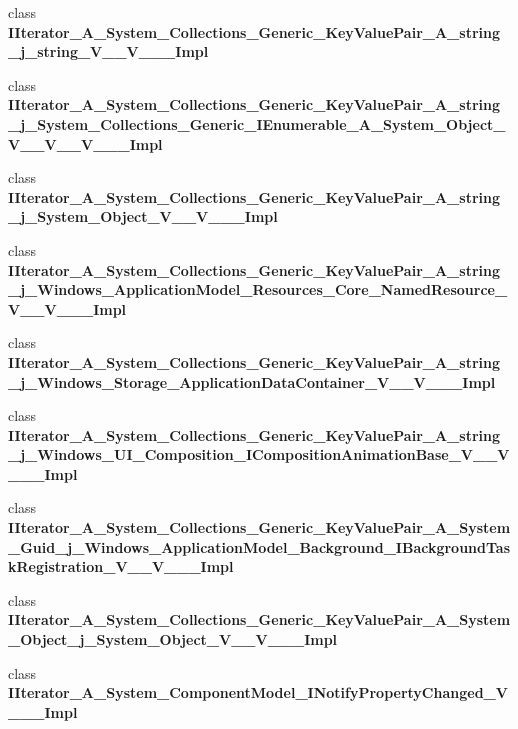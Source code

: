 \begin{DoxyCompactItemize}
\item 
class {\bfseries I\+Iterator\+\_\+\+A\+\_\+\+System\+\_\+\+Collections\+\_\+\+Generic\+\_\+\+Key\+Value\+Pair\+\_\+\+A\+\_\+string\+\_\+j\+\_\+string\+\_\+\+V\+\_\+\+\_\+\+V\+\_\+\+\_\+\+\_\+\+Impl}
\item 
class {\bfseries I\+Iterator\+\_\+\+A\+\_\+\+System\+\_\+\+Collections\+\_\+\+Generic\+\_\+\+Key\+Value\+Pair\+\_\+\+A\+\_\+string\+\_\+j\+\_\+\+System\+\_\+\+Collections\+\_\+\+Generic\+\_\+\+I\+Enumerable\+\_\+\+A\+\_\+\+System\+\_\+\+Object\+\_\+\+V\+\_\+\+\_\+\+V\+\_\+\+\_\+\+V\+\_\+\+\_\+\+\_\+\+Impl}
\item 
class {\bfseries I\+Iterator\+\_\+\+A\+\_\+\+System\+\_\+\+Collections\+\_\+\+Generic\+\_\+\+Key\+Value\+Pair\+\_\+\+A\+\_\+string\+\_\+j\+\_\+\+System\+\_\+\+Object\+\_\+\+V\+\_\+\+\_\+\+V\+\_\+\+\_\+\+\_\+\+Impl}
\item 
class {\bfseries I\+Iterator\+\_\+\+A\+\_\+\+System\+\_\+\+Collections\+\_\+\+Generic\+\_\+\+Key\+Value\+Pair\+\_\+\+A\+\_\+string\+\_\+j\+\_\+\+Windows\+\_\+\+Application\+Model\+\_\+\+Resources\+\_\+\+Core\+\_\+\+Named\+Resource\+\_\+\+V\+\_\+\+\_\+\+V\+\_\+\+\_\+\+\_\+\+Impl}
\item 
class {\bfseries I\+Iterator\+\_\+\+A\+\_\+\+System\+\_\+\+Collections\+\_\+\+Generic\+\_\+\+Key\+Value\+Pair\+\_\+\+A\+\_\+string\+\_\+j\+\_\+\+Windows\+\_\+\+Storage\+\_\+\+Application\+Data\+Container\+\_\+\+V\+\_\+\+\_\+\+V\+\_\+\+\_\+\+\_\+\+Impl}
\item 
class {\bfseries I\+Iterator\+\_\+\+A\+\_\+\+System\+\_\+\+Collections\+\_\+\+Generic\+\_\+\+Key\+Value\+Pair\+\_\+\+A\+\_\+string\+\_\+j\+\_\+\+Windows\+\_\+\+U\+I\+\_\+\+Composition\+\_\+\+I\+Composition\+Animation\+Base\+\_\+\+V\+\_\+\+\_\+\+V\+\_\+\+\_\+\+\_\+\+Impl}
\item 
class {\bfseries I\+Iterator\+\_\+\+A\+\_\+\+System\+\_\+\+Collections\+\_\+\+Generic\+\_\+\+Key\+Value\+Pair\+\_\+\+A\+\_\+\+System\+\_\+\+Guid\+\_\+j\+\_\+\+Windows\+\_\+\+Application\+Model\+\_\+\+Background\+\_\+\+I\+Background\+Task\+Registration\+\_\+\+V\+\_\+\+\_\+\+V\+\_\+\+\_\+\+\_\+\+Impl}
\item 
class {\bfseries I\+Iterator\+\_\+\+A\+\_\+\+System\+\_\+\+Collections\+\_\+\+Generic\+\_\+\+Key\+Value\+Pair\+\_\+\+A\+\_\+\+System\+\_\+\+Object\+\_\+j\+\_\+\+System\+\_\+\+Object\+\_\+\+V\+\_\+\+\_\+\+V\+\_\+\+\_\+\+\_\+\+Impl}
\item 
class {\bfseries I\+Iterator\+\_\+\+A\+\_\+\+System\+\_\+\+Component\+Model\+\_\+\+I\+Notify\+Property\+Changed\+\_\+\+V\+\_\+\+\_\+\+\_\+\+Impl}

\end{DoxyCompactItemize}
